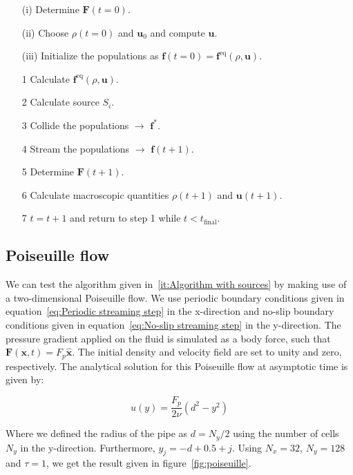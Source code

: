 \begin{itemize}\label{it:Algorithm with sources}
    \item[(i)] Determine $\bm{F}(t=0)$.
    \item[(ii)] Choose $\rho(t=0)$ and $\bm{u}_0$ and compute $\bm{u}$.
    \item[(iii)] Initialize the populations as $\bm{f}(t=0) = \bm{f}^{\text{eq}}(\rho, \bm{u})$. 
    \item[1] Calculate $\bm{f}^{\text{eq}}(\rho, \bm{u})$.
    \item[2] Calculate source $S_i$.
    \item[3] Collide the populations $\rightarrow$ $\bm{f}^*$.
    \item[4] Stream the populations $\rightarrow$ $\bm{f}(t + 1)$.
    \item[5] Determine $\bm{F}(t + 1)$.
    \item[6] Calculate macroscopic quantities $\rho(t + 1)$ and $\bm{u}(t + 1)$.
    \item[7] $t = t + 1$ and return to step 1 while $t < t_{\text{final}}$.
\end{itemize}

\subsection{Poiseuille flow}
We can test the algorithm given in~\ref{it:Algorithm with sources} by making use of a two-dimensional Poiseuille flow. We use periodic boundary conditions given in equation~\ref{eq:Periodic streaming step} in the x-direction and no-slip boundary conditions given in equation~\ref{eq:No-slip streaming step} in the y-direction. The pressure gradient applied on the fluid is simulated as a body force, such that $\bm{F}(\bm{x}, t) = F_p \hat{\bm{x}}$. The initial density and velocity field are set to unity and zero, respectively. The analytical solution for this Poiseuille flow at asymptotic time is given by:

\begin{equation}
    u(y) = \frac{F_p}{2 \nu} \left( d^2 - y^2 \right)
\end{equation}

Where we defined the radius of the pipe as $d = N_y/2$ using the number of cells $N_y$ in the y-direction. Furthermore, $y_j = -d + 0.5 + j$. Using $N_x = 32$, $N_y = 128$ and $\tau = 1$, we get the result given in figure~\ref{fig:poiseuille}.

